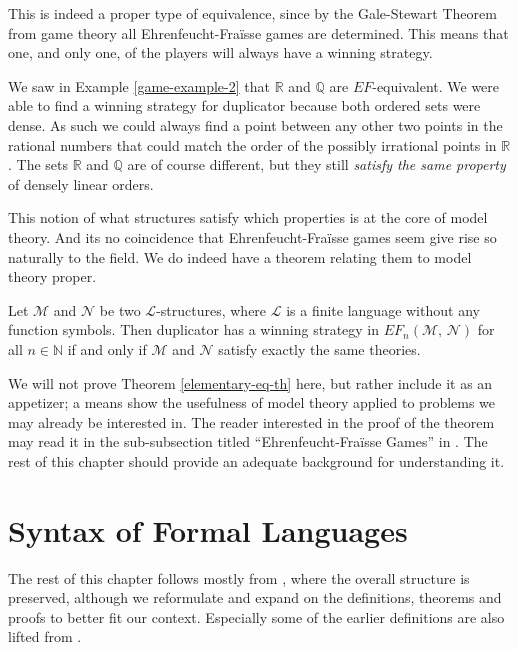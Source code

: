 \documentclass[../../main.tex]{subfiles}
\begin{document}
This is indeed a proper type of equivalence, since by the Gale-Stewart Theorem from game theory all Ehrenfeucht-Fra\"isse games are determined.\cite[\S 6]{Wil24}
This means that one, and only one, of the players will always have a winning strategy.

We saw in Example \ref{game-example-2} that $\mathbb{R}$ and $\mathbb{Q}$ are $EF$-equivalent.
We were able to find a winning strategy for duplicator because both ordered sets were dense. 
As such we could always find a point between any other two points in the rational numbers that could match the order of the possibly irrational points in $\mathbb{R}$.
The sets $\mathbb{R}$ and $\mathbb{Q}$ are of course different, but they still \textit{satisfy the same property} of densely linear orders.

This notion of what structures satisfy which properties is at the core of model theory.
And its no coincidence that Ehrenfeucht-Fra\"isse games seem give rise so naturally to the field. 
We do indeed have a theorem relating them to model theory proper.

\begin{theorem}\cite[Theorem 2.4.6]{Mar02}\label{elementary-eq-th}
    Let $\mathcal{M}$ and $\mathcal{N}$ be two $\mathcal{L}$-structures, where $\mathcal{L}$ is a finite language without any function symbols.
    Then duplicator has a winning strategy in $EF_n(\mathcal{M},\, \mathcal{N})$ for all $n \in \mathbb{N}$ if and only if $\mathcal{M}$ and $\mathcal{N}$ satisfy exactly the same theories.
\end{theorem}
 
We will not prove Theorem \ref{elementary-eq-th} here, but rather include it as an appetizer;
a means show the usefulness of model theory applied to problems we may already be interested in.
The reader interested in the proof of the theorem may read it in the sub-subsection titled ``Ehrenfeucht-Fra\"isse Games'' in \cite[\S 2.4]{Mar02}.
The rest of this chapter should provide an adequate background for understanding it.
 
\section{Syntax of Formal Languages}
The rest of this chapter follows mostly from \cite[\S\S 1.3, 1.4, 2.1]{Cha90}, where the overall structure is preserved, 
although we reformulate and expand on the definitions, theorems and proofs to better fit our context.
Especially some of the earlier definitions are also lifted from \cite{Mar02}.
\end{document}
